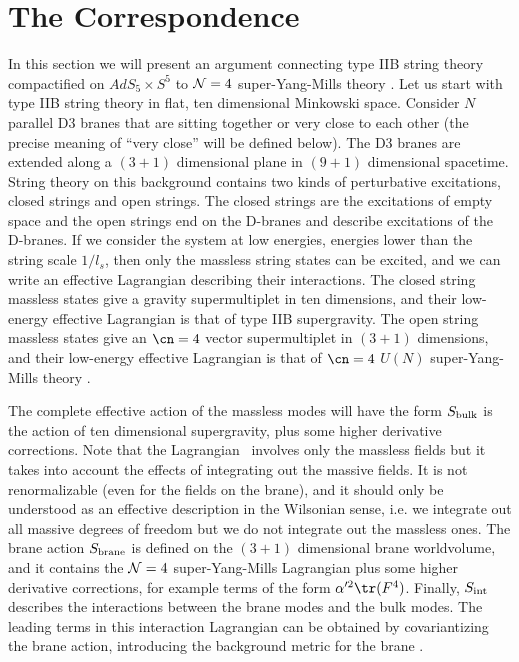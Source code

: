 
\section{The Correspondence}
\label{correspondence}

In this section we will present an argument connecting type IIB string
theory compactified on $AdS_5\times S^5$ to ${\cal N} =4 $
super-Yang-Mills theory
\cite{Maldacena:1997re}.  Let us start with type IIB string theory in
flat, ten dimensional Minkowski space. Consider $N$ parallel D3 branes
that are sitting together or very close to each other (the precise
meaning of ``very close'' will be defined below). The D3 branes are
extended along a $(3+1)$ dimensional plane in $(9+1)$ dimensional
spacetime.  String theory on this background contains two kinds of
perturbative excitations, closed strings and open strings. The closed
strings are the excitations of empty space and the open strings
end on the D-branes and describe 
excitations of the D-branes.
 If we consider the system at low energies, energies lower
than the string scale $1/l_s$, then only the massless string states
can be excited, and we can write an effective Lagrangian describing
their interactions. The closed string massless states give a gravity
supermultiplet in ten dimensions, and their low-energy effective
Lagrangian is that of type IIB supergravity. The open string massless
states give an $\cn=4$ vector supermultiplet in $(3+1)$ dimensions,
and their low-energy effective Lagrangian is that of $\cn=4$ $U(N)$
super-Yang-Mills theory
\cite{Witten:1996im,joebook}. 

The complete effective action of the massless modes will have
the form
  $S_{\rm bulk}$ is
the action of ten dimensional supergravity, plus some higher
derivative corrections.  Note that the Lagrangian \lowenergy\ involves
only the massless fields but it takes into account the effects of
integrating out the massive fields. It is not renormalizable (even for
the fields on the brane), and it should only be understood as an
effective description in the Wilsonian sense, i.e. we integrate out
all massive degrees of freedom but we do not integrate out the
massless ones. The brane action $S_{\rm brane}$ is defined on the
$(3+1)$ dimensional brane worldvolume, and it contains the ${\cal N} =
4 $ super-Yang-Mills Lagrangian plus some higher derivative
corrections, for example terms of the form $\alpha'^2 \tr(F^4) $.
Finally, $S_{\rm int}$ describes the interactions between the brane
modes and the bulk modes. The leading terms in this interaction
Lagrangian can be obtained by covariantizing the brane action,
introducing the background metric for the brane
\cite{Leigh:1989jq}.  

